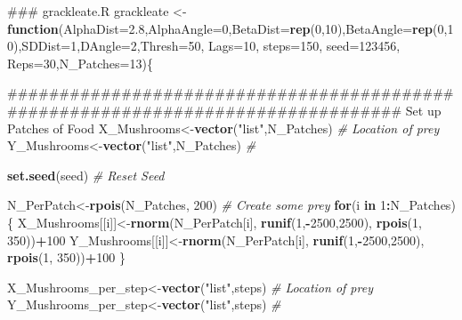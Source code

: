 \documentclass[]{article}
\newenvironment{Shaded}{\begin{snugshade}}{\end{snugshade}}
\newcommand{\KeywordTok}[1]{\textcolor[rgb]{0.13,0.29,0.53}{\textbf{#1}}}
\newcommand{\DataTypeTok}[1]{\textcolor[rgb]{0.13,0.29,0.53}{#1}}
\newcommand{\DecValTok}[1]{\textcolor[rgb]{0.00,0.00,0.81}{#1}}
\newcommand{\FloatTok}[1]{\textcolor[rgb]{0.00,0.00,0.81}{#1}}
\newcommand{\StringTok}[1]{\textcolor[rgb]{0.31,0.60,0.02}{#1}}
\newcommand{\CommentTok}[1]{\textcolor[rgb]{0.56,0.35,0.01}{\textit{#1}}}
\newcommand{\ControlFlowTok}[1]{\textcolor[rgb]{0.13,0.29,0.53}{\textbf{#1}}}
\newcommand{\OperatorTok}[1]{\textcolor[rgb]{0.81,0.36,0.00}{\textbf{#1}}}
\newcommand{\NormalTok}[1]{#1}
\begin{document}
\begin{Shaded}
\begin{Highlighting}[]
\NormalTok{### grackleate.R}
\NormalTok{grackleate <-}\StringTok{ }\ControlFlowTok{function}\NormalTok{(}\DataTypeTok{AlphaDist=}\FloatTok{2.8}\NormalTok{,}\DataTypeTok{AlphaAngle=}\DecValTok{0}\NormalTok{,}\DataTypeTok{BetaDist=}\KeywordTok{rep}\NormalTok{(}\DecValTok{0}\NormalTok{,}\DecValTok{10}\NormalTok{),}\DataTypeTok{BetaAngle=}\KeywordTok{rep}\NormalTok{(}\DecValTok{0}\NormalTok{,}\DecValTok{10}\NormalTok{),}\DataTypeTok{SDDist=}\DecValTok{1}\NormalTok{,}\DataTypeTok{DAngle=}\DecValTok{2}\NormalTok{,}\DataTypeTok{Thresh=}\DecValTok{50}\NormalTok{, }\DataTypeTok{Lags=}\DecValTok{10}\NormalTok{, }\DataTypeTok{steps=}\DecValTok{150}\NormalTok{, }\DataTypeTok{seed=}\DecValTok{123456}\NormalTok{, }\DataTypeTok{Reps=}\DecValTok{30}\NormalTok{,}\DataTypeTok{N_Patches=}\DecValTok{13}\NormalTok{)\{}

\NormalTok{################################################################################# Set up Patches of Food                                                }
\NormalTok{X_Mushrooms<-}\KeywordTok{vector}\NormalTok{(}\StringTok{"list"}\NormalTok{,N_Patches)                                           }\CommentTok{# Location of prey}
\NormalTok{Y_Mushrooms<-}\KeywordTok{vector}\NormalTok{(}\StringTok{"list"}\NormalTok{,N_Patches)                                           }\CommentTok{# }

\KeywordTok{set.seed}\NormalTok{(seed)                                                                  }\CommentTok{# Reset Seed}

\NormalTok{N_PerPatch<-}\KeywordTok{rpois}\NormalTok{(N_Patches, }\DecValTok{200}\NormalTok{)                                               }\CommentTok{# Create some prey}
\ControlFlowTok{for}\NormalTok{(i }\ControlFlowTok{in} \DecValTok{1}\OperatorTok{:}\NormalTok{N_Patches)\{}
\NormalTok{X_Mushrooms[[i]]<-}\KeywordTok{rnorm}\NormalTok{(N_PerPatch[i], }\KeywordTok{runif}\NormalTok{(}\DecValTok{1}\NormalTok{,}\OperatorTok{-}\DecValTok{2500}\NormalTok{,}\DecValTok{2500}\NormalTok{), }\KeywordTok{rpois}\NormalTok{(}\DecValTok{1}\NormalTok{, }\DecValTok{350}\NormalTok{))}\OperatorTok{+}\DecValTok{100}
\NormalTok{Y_Mushrooms[[i]]<-}\KeywordTok{rnorm}\NormalTok{(N_PerPatch[i], }\KeywordTok{runif}\NormalTok{(}\DecValTok{1}\NormalTok{,}\OperatorTok{-}\DecValTok{2500}\NormalTok{,}\DecValTok{2500}\NormalTok{), }\KeywordTok{rpois}\NormalTok{(}\DecValTok{1}\NormalTok{, }\DecValTok{350}\NormalTok{))}\OperatorTok{+}\DecValTok{100}
\NormalTok{\}}

\NormalTok{X_Mushrooms_per_step<-}\KeywordTok{vector}\NormalTok{(}\StringTok{"list"}\NormalTok{,steps)                                      }\CommentTok{# Location of prey}
\NormalTok{Y_Mushrooms_per_step<-}\KeywordTok{vector}\NormalTok{(}\StringTok{"list"}\NormalTok{,steps)                                      }\CommentTok{#}


\end{Highlighting}
\end{Shaded}
\end{document}
